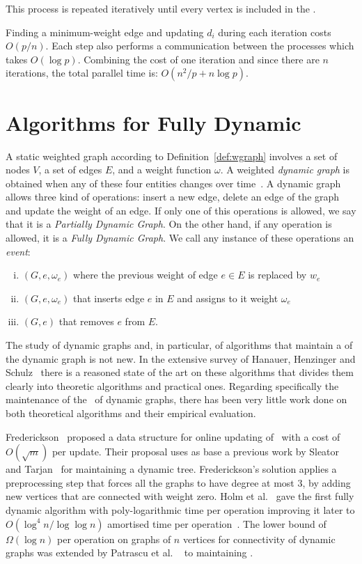 This process is repeated iteratively until every vertex is included in the \mst.

Finding a minimum-weight edge and updating $d_i$ during each iteration costs $O(p/n)$. Each step also performs a communication between the processes which takes $O(\log p)$. Combining the cost of one iteration and since there are $n$ iterations, the total parallel time is: $O(n^2/p + n\log p)$.

\section{Algorithms for Fully Dynamic \mst}

A static weighted graph according to Definition~\ref{def:wgraph} involves a set of nodes $V$, a set of edges $E$, and a weight function $\omega$. A weighted \emph{dynamic graph} is obtained when any of these four entities changes over time~\cite{Harary1997}. A dynamic graph allows three kind of operations: insert a new edge, delete an edge of the graph and update the weight of an edge. If only one of this operations is allowed, we say that it is a \emph{Partially Dynamic Graph}. On the other hand, if any operation is allowed, it is a \emph{Fully Dynamic Graph}. We call any instance of these operations an \emph{event}: 
\begin{enumerate}[(i)]
\item {\label{op:update} {\opupdate$(G,e,\omega_e)$} where the previous 
weight of edge $e\in E$ is replaced by $w_e$}
\item {\label{op:insert} {\opinsert$(G,e,\omega_e)$} that inserts edge $e$ in $E$ 
and assigns to it weight $\omega_e$ }
\item {\label{op:remove} {\opremove$(G,e)$} that removes $e$ from $E$.}
\end{enumerate}

The study of dynamic graphs and, in particular, of algorithms that maintain a \mst of the dynamic
graph is not new. In the extensive survey of Hanauer, Henzinger and Schulz~\cite{Hanauer2022}
there is a reasoned state of the art on these algorithms that divides them 
clearly into theoretic algorithms and practical ones. Regarding specifically the
maintenance of the \mst\ of dynamic graphs, there has been very little work done
on both theoretical algorithms and their empirical evaluation. 

Frederickson~\cite{Frederickson1985} proposed a data structure for online updating
of \mst\ with a cost of $O(\sqrt{m})$ per update. Their proposal uses as base a 
previous work by Sleator and Tarjan~\cite{Sleator1983} for 
maintaining a dynamic tree. Frederickson's solution applies a preprocessing step 
that forces all the graphs to have degree at most 3, by adding new vertices that 
are connected with weight zero. Holm et al.~\cite{Holm2001} gave the first 
fully dynamic algorithm with poly-logarithmic time per operation improving it 
later to $O(\log^4 n/\log\log n)$ amortised time per operation~\cite{holmetal2015}.
The lower bound of $\Omega(\log n)$ per operation on graphs of $n$ vertices for 
connectivity of dynamic graphs was extended by Patrascu et al.
~\cite{Patrascu2006} to maintaining \msts.

